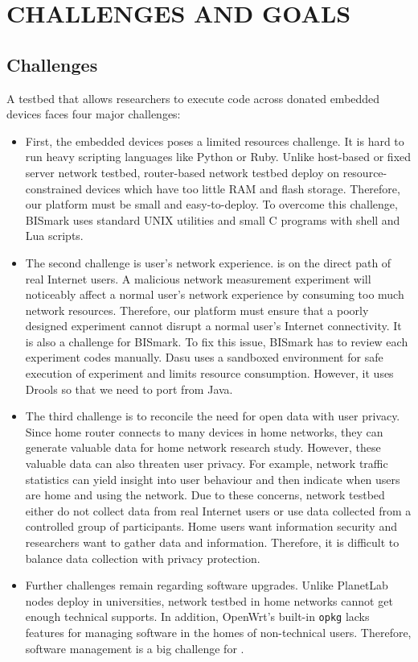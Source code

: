 \chapter{CHALLENGES AND GOALS}
\label{sec.goals_challenges}
\section{Challenges}
\label{ssec.challenges}
A testbed that allows researchers to execute code across donated embedded devices faces four major challenges: 
\begin{itemize}
\item First, the embedded devices poses a limited resources challenge. It is hard to run heavy scripting languages like Python or Ruby. Unlike host-based or fixed server network testbed, router-based network testbed deploy on resource-constrained devices which have too little RAM and flash storage. Therefore, our platform must be small and easy-to-deploy. To overcome this challenge, BISmark uses standard UNIX utilities and small C programs with shell and Lua scripts.  
\item The second challenge is user's network experience. \sysname is on the direct path of real Internet users. A malicious network measurement experiment will noticeably affect a normal user's network experience by consuming too much network resources. Therefore, our platform must ensure that a poorly designed experiment cannot disrupt a normal user's Internet connectivity. It is also a challenge for BISmark. To fix this issue, BISmark has to review each experiment codes manually. Dasu uses a sandboxed environment for safe execution of experiment and limits resource consumption. However, it uses Drools so that we need to port from Java.
\item The third challenge is to reconcile the need for open data with user privacy. Since home router connects to many devices in home networks, they can generate valuable data for home network research study. However, these valuable data can also threaten user privacy. For example, network traffic statistics can yield insight into user behaviour and then indicate when users are home and using the network. Due to these concerns, network testbed either do not collect data from real Internet users or use data collected from a controlled group of participants. Home users want information security and researchers want to gather data and information. Therefore, it is difficult to balance data collection with privacy protection.
\item Further challenges remain regarding software upgrades. Unlike PlanetLab nodes deploy in universities, network testbed in home networks cannot get enough technical supports. In addition, OpenWrt's built-in \texttt{opkg} lacks features for managing software in the homes of non-technical users. Therefore, software management is a big challenge for \sysname.  
\end{itemize}
